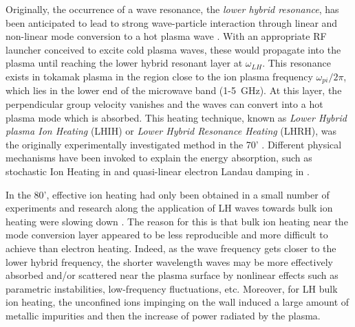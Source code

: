 Originally, the occurrence of a wave resonance, the \emph{lower hybrid resonance}, has been anticipated to lead to strong wave-particle interaction through linear and non-linear mode conversion to a hot plasma wave . With an appropriate RF launcher conceived to excite cold plasma waves, these would propagate into the plasma until reaching the lower hybrid resonant layer at $\omega_{LH}$. This resonance exists in tokamak plasma in the region close to the ion plasma frequency $\omega_{pi}/2\pi$, which lies in the lower end of the microwave band (1-5~GHz). At this layer, the perpendicular group velocity vanishes and the waves can convert into a hot plasma mode which is absorbed. This heating technique, known as \emph{Lower Hybrid plasma Ion Heating} (LHIH) or \emph{Lower Hybrid Resonance Heating} (LHRH), was the originally experimentally investigated method in the 70' . Different physical mechanisms have been invoked to explain the energy absorption, such as stochastic Ion Heating in  and quasi-linear electron Landau damping in .

In the 80', effective ion heating had only been obtained in a small number of experiments and research along the application of LH waves towards bulk ion heating were slowing down . The reason for this is that bulk ion heating near the mode conversion layer appeared to be less reproducible and more difficult to achieve than electron heating. Indeed, as the wave frequency gets closer to the lower hybrid frequency, the shorter wavelength waves may be more effectively absorbed and/or scattered near the plasma surface by nonlinear effects such as parametric instabilities, low-frequency fluctuations, etc. Moreover, for LH bulk ion heating, the unconfined ions impinging on the wall induced a large amount of metallic impurities and then the increase of power radiated by the plasma.

